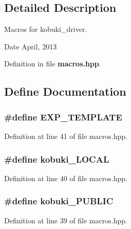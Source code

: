 \subsection{\-Detailed \-Description}
\-Macros for kobuki\-\_\-driver. \begin{DoxyDate}{\-Date}
\-April, 2013 
\end{DoxyDate}


\-Definition in file {\bf macros.\-hpp}.



\subsection{\-Define \-Documentation}
\subsubsection[{\-E\-X\-P\-\_\-\-T\-E\-M\-P\-L\-A\-T\-E}]{\setlength{\rightskip}{0pt plus 5cm}\#define {\bf \-E\-X\-P\-\_\-\-T\-E\-M\-P\-L\-A\-T\-E}}\label{macros_8hpp_aaaaea9bc9168746bc8d93e5e580ea365}


\-Definition at line 41 of file macros.\-hpp.

\subsubsection[{kobuki\-\_\-\-L\-O\-C\-A\-L}]{\setlength{\rightskip}{0pt plus 5cm}\#define {\bf kobuki\-\_\-\-L\-O\-C\-A\-L}}\label{macros_8hpp_a006a4ca34f6e83bce1e10abd9e29c84e}


\-Definition at line 40 of file macros.\-hpp.

\subsubsection[{kobuki\-\_\-\-P\-U\-B\-L\-I\-C}]{\setlength{\rightskip}{0pt plus 5cm}\#define {\bf kobuki\-\_\-\-P\-U\-B\-L\-I\-C}}\label{macros_8hpp_a4b92966a9fada0eb71fe09d15a768343}


\-Definition at line 39 of file macros.\-hpp.

